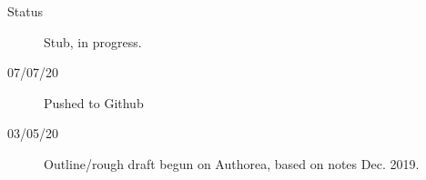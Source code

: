 \begin{description}
\item [{Status}] Stub, in progress.
\item [{07/07/20}] Pushed to Github 
\item [{03/05/20}] Outline/rough draft begun on Authorea, based on notes Dec. 2019.
\end{description}